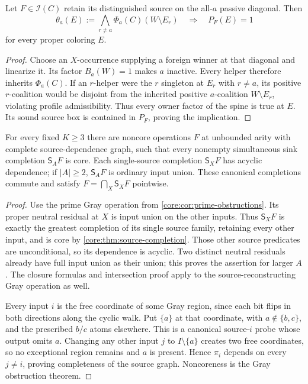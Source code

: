 \begin{corollary}
\label{core:cor:inactive-owner-box}
Let $F\in\mathcal I(C)$ retain its distinguished source on the
all-$a$ passive diagonal. Then
\[
 \theta_a(E):=\bigwedge_{r\ne a}\Phi_a(C)(W\setminus E_r)
 \quad\Longrightarrow\quad P_F(E)=1
\]
for every proper coloring $E$.
\end{corollary}
\begin{proof}
Choose an $X$-occurrence supplying a foreign winner at that diagonal and
linearize it. Its factor $B_a(W)=1$ makes $a$ inactive. Every helper
therefore inherits $\Phi_a(C)$. If an $r$-helper were the $r$ singleton
at $E_r$ with $r\ne a$, its positive $r$-coalition would be disjoint
from the inherited positive $a$-coalition $W\setminus E_r$, violating
profile admissibility. Thus every owner factor of the spine is true at
$E$. Its sound source box is contained in $P_F$, proving the implication.
\end{proof}

\begin{corollary}
\label{core:cor:sink-completion-obstruction}
For every fixed $K\geq3$ there are noncore operations $F$ at unbounded
arity with complete source-dependence graph, such that every nonempty
simultaneous sink completion $\mathsf S_AF$ is core.
Each single-source completion $\mathsf S_XF$ has acyclic dependence;
if $|A|\geq2$, $\mathsf S_AF$ is ordinary input union.
These canonical completions commute and satisfy
$F=\bigcap_X\mathsf S_XF$ pointwise.
\end{corollary}
\begin{proof}
Use the prime Gray operation from \cref{core:cor:prime-obstructions}.
Its proper neutral residual at $X$ is input union on the other inputs.
Thus $\mathsf S_XF$ is exactly the greatest completion of its single
source family, retaining every other input, and is core by
\cref{core:thm:source-completion}. Those other source predicates are
unconditional, so its dependence is acyclic. Two distinct neutral
residuals already have full input union as their union; this proves the
assertion for larger $A$. The closure formulas and intersection proof
apply to the source-reconstructing Gray operation as well.

Every input $i$ is the free coordinate of some Gray region, since each
bit flips in both directions along the cyclic walk. Put $\{a\}$ at
that coordinate, with $a\notin\{b,c\}$, and the prescribed $b/c$
atoms elsewhere. This is a canonical source-$i$ probe whose output omits $a$.
Changing any other input $j$ to $I\setminus\{a\}$ creates two free
coordinates, so no exceptional region remains and $a$ is present.
Hence $\pi_i$ depends on every $j\ne i$, proving completeness of the
source graph. Noncoreness is the Gray obstruction theorem.
\end{proof}
